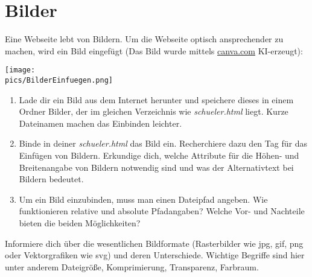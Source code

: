\section{Bilder}
Eine Webseite lebt von Bildern. Um die Webseite optisch ansprechender zu machen, wird ein Bild eingefügt (Das Bild wurde mittels \href{https://www.canva.com/}{canva.com} KI-erzeugt):
\begin{minipage}[t]{\textwidth}
    \texttt{[image: \\pics/BilderEinfuegen.png]}
\end{minipage}
\begin{Exercise}[title=, label=Bilder]
    \begin{enumerate}
        \item Lade dir ein Bild aus dem Internet herunter und speichere dieses in einem Ordner Bilder, der im gleichen Verzeichnis wie \textit{schueler.html} liegt. Kurze Dateinamen machen das Einbinden leichter.
        \item Binde in deiner \textit{schueler.html} das Bild ein. Recherchiere dazu den Tag für das Einfügen von Bildern. Erkundige dich, welche Attribute für die Höhen- und Breitenangabe von Bildern notwendig sind und was der Alternativtext bei Bildern bedeutet.
        \item Um ein Bild einzubinden, muss man einen Dateipfad angeben. Wie funktionieren relative und absolute Pfadangaben? Welche Vor- und Nachteile bieten die beiden Möglichkeiten?
    \end{enumerate}
    Informiere dich über die wesentlichen Bildformate (Rasterbilder wie jpg, gif, png oder Vektorgrafiken wie svg) und deren Unterschiede. Wichtige Begriffe sind hier unter anderem Dateigröße, Komprimierung, Transparenz, Farbraum.
\end{Exercise}


